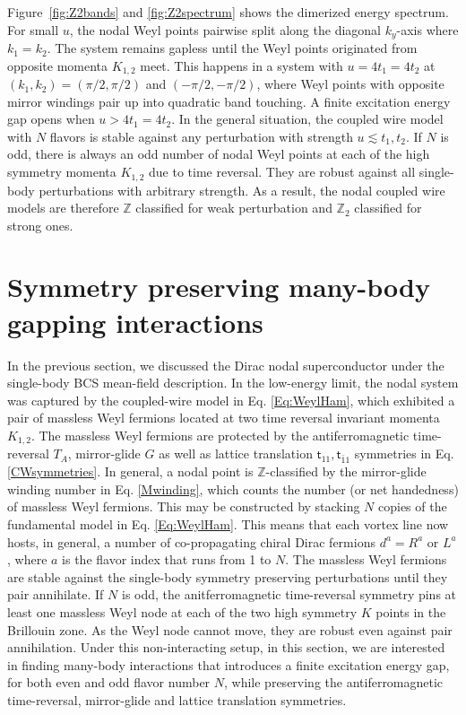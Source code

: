 Figure~\ref{fig:Z2bands} and \ref{fig:Z2spectrum} shows the dimerized energy spectrum. For small $u$, the nodal Weyl points pairwise split along the diagonal $k_y$-axis where $k_1=k_2$. The system remains gapless until the Weyl points originated from opposite momenta $K_{1,2}$ meet. This happens in a system with $u=4t_1=4t_2$ at $(k_1,k_2)=(\pi/2,\pi/2)$ and $(-\pi/2,-\pi/2)$, where Weyl points with opposite mirror windings pair up into quadratic band touching. A finite excitation energy gap opens when $u>4t_1=4t_2$. In the general situation, the coupled wire model with $N$ flavors is stable against any perturbation with strength $u\lesssim t_1,t_2$. If $N$ is odd, there is always an odd number of nodal Weyl points at each of the high symmetry momenta $K_{1,2}$ due to time reversal. They are robust against all single-body perturbations with arbitrary strength. As a result, the nodal coupled wire models are therefore $\mathbb{Z}$ classified for weak perturbation and $\mathbb{Z}_2$ classified for strong ones.



\section{Symmetry preserving many-body gapping interactions}\label{sec:manybody1}
In the previous section, we discussed the Dirac nodal superconductor under the single-body BCS mean-field description. In the low-energy limit, the nodal system was captured by the coupled-wire model in Eq. \eqref{Eq:WeylHam}, which exhibited a pair of massless Weyl fermions located at two time reversal invariant momenta $K_{1,2}$. The massless Weyl fermions are protected by the antiferromagnetic time-reversal $T_A$, mirror-glide $G$ as well as lattice translation $\mathsf{t}_{11},\mathsf{t}_{\bar{1}1}$ symmetries in Eq. \eqref{CWsymmetries}. In general, a nodal point is $\mathbb{Z}$-classified by the mirror-glide winding number in Eq. \eqref{Mwinding}, which counts the number (or net handedness) of massless Weyl fermions. This may be constructed by stacking $N$ copies of the fundamental model in Eq. \eqref{Eq:WeylHam}. This means that each vortex line now hosts, in general, a number of co-propagating chiral Dirac fermions $d^a=R^a$ or $L^a$, where $a$ is the flavor index that runs from 1 to $N$. The massless Weyl fermions are stable against the single-body symmetry preserving perturbations until they pair annihilate. If $N$ is odd, the anitferromagnetic time-reversal symmetry pins at least one massless Weyl node at each of the two high symmetry $K$ points in the Brillouin zone. As the Weyl node cannot move, they are robust even against pair annihilation. Under this non-interacting setup, in this section, we are interested in finding many-body interactions that introduces a finite excitation energy gap, for both even and odd flavor number $N$, while preserving the antiferromagnetic time-reversal, mirror-glide and lattice translation symmetries.

